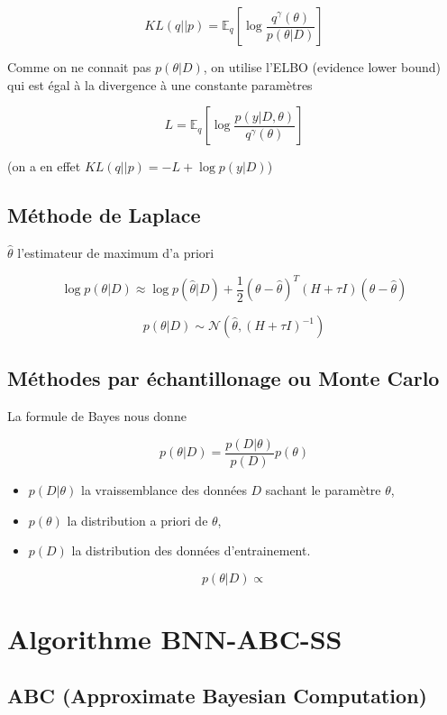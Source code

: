 \documentclass[french,12pt]{article}
\begin{document}
$$KL(q||p) = \mathbb{E}_q \left[\log \frac{q^{\gamma}(\theta)}{p(\theta | D)}\right]$$

Comme on ne connait pas $p(\theta | D)$, on utilise l'ELBO (evidence lower bound)
qui est égal à la divergence à une constante paramètres

$$L =\mathbb{E}_q \left[\log \frac{p(y | D, \theta)}{q^{\gamma}(\theta)}\right]$$

(on a en effet $KL(q||p) = -L +  \log p(y| D)$)

\subsection{Méthode de Laplace}

$\hat{\theta}$ l'estimateur de maximum d'a priori

$$\log p(\theta | D) \approx \log p(\hat{\theta} | D)
    + \frac{1}{2} (\theta - \hat{\theta})^T (H + \tau I)
    (\theta - \hat{\theta})$$

$$p(\theta | D) \sim \mathcal{N}(\hat{\theta}, (H + \tau I)^{-1})$$

\subsection{Méthodes par échantillonage ou Monte Carlo}

La formule de Bayes nous donne

$$p(\theta | D) = \frac{p(D | \theta) }{p(D)}p(\theta)$$

\begin{itemize}
    \item $p(D | \theta)$ la vraissemblance des données $D$ sachant le paramètre $\theta$,
    \item $p(\theta)$ la distribution a priori de $\theta$,
    \item $p(D)$ la distribution des données d'entrainement.
\end{itemize}

$$p(\theta | D) \propto $$

\pagebreak

\section{Algorithme BNN-ABC-SS}

\subsection{ABC (Approximate Bayesian Computation)}
\end{document}
